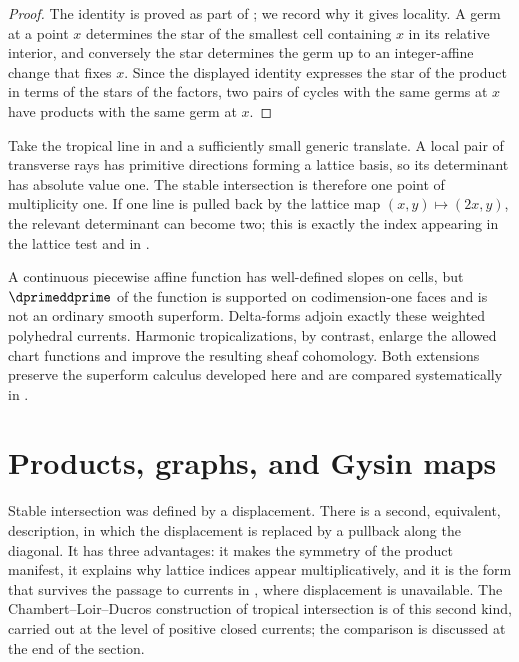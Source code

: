\begin{proof}
The identity is proved as part of
; we record why it gives locality.  A
germ at a point $x$ determines the star of the smallest cell containing $x$
in its relative interior, and conversely the star determines the germ up to
an integer-affine change that fixes $x$.  Since the displayed identity
expresses the star of the product in terms of the stars of the factors, two
pairs of cycles with the same germs at $x$ have products with the same germ
at $x$.
\end{proof}

\begin{example}
\label{ex:ch10-two-lines-summary}
Take the tropical line in  and a sufficiently
small generic translate.  A local pair of transverse rays has primitive
directions forming a lattice basis, so its determinant has absolute value
one.  The stable intersection is therefore one point of multiplicity one.
If one line is pulled back by the lattice map $(x,y)\mapsto(2x,y)$, the
relevant determinant can become two; this is exactly the index appearing in
the lattice test and in .
\end{example}

\begin{remark}
\label{rem:ch10-delta-forms-motivation}
A continuous piecewise affine function has well-defined slopes on cells, but
$\dprimeddprime$ of the function is supported on codimension-one faces and is not an
ordinary smooth superform. Delta-forms adjoin exactly these weighted
polyhedral currents. Harmonic tropicalizations, by contrast, enlarge the
allowed chart functions and improve the resulting sheaf cohomology. Both
extensions preserve the superform calculus developed here and are compared
systematically in .
\end{remark}

\section{Products, graphs, and Gysin maps}
\label{sec:ch10-gysin}

Stable intersection was defined by a displacement.  There is a second,
equivalent, description, in which the displacement is replaced by a
pullback along the diagonal.  It has three advantages: it makes the
symmetry of the product manifest, it explains why lattice indices appear
multiplicatively, and it is the form that survives the passage to currents in
, where displacement is unavailable.
The Chambert--Loir--Ducros construction of tropical intersection is of this
second kind, carried out at the level of positive closed currents; the
comparison is discussed at the end of the section.

